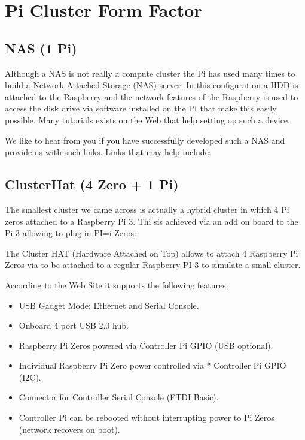 \chapter{Pi Cluster Form Factor}\label{c:pi-cluster-form-factor}

\section{NAS (1 Pi)}\label{nas-1-pi}

Although a NAS is not really a compute cluster the Pi has used many times to build a
Network Attached Storage (NAS) server. In this configuration a HDD is
attached to the Raspberry and the network features of the Raspberry is
used to access the disk drive via software installed on the PI that
make this easily possible. Many tutorials exists on the Web that help
setting op such a device.

We like to hear from you if you have successfully developed such a NAS
and provide us with such links. Links that may help include:



\section{ClusterHat (4 Zero + 1 Pi)}\label{clusterhat-4-zero-1-pi}

The smallest cluster we came across is actually a hybrid cluster in
which 4 Pi zeros attached to a Raspberry Pi 3. Thi sis achieved via an
add on board to the Pi 3 allowing to plug in PI=i Zeros:




The Cluster HAT (Hardware Attached on Top) allows to attach 4 Raspberry
Pi Zeros via to be attached to a regular Raspberry PI 3 to simulate a
small cluster.

According to the Web Site it supports the following features:

\begin{itemize}
\item
  USB Gadget Mode: Ethernet and Serial Console.
\item
  Onboard 4 port USB 2.0 hub.
\item
  Raspberry Pi Zeros powered via Controller Pi GPIO (USB optional).
\item
  Individual Raspberry Pi Zero power controlled via * Controller Pi GPIO
  (I2C).
\item
  Connector for Controller Serial Console (FTDI Basic).
\item
  Controller Pi can be rebooted without interrupting power to Pi Zeros
  (network recovers on boot).
\end{itemize}

